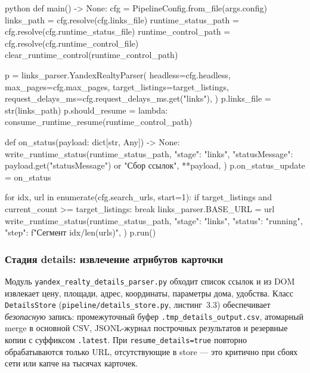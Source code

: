 \begin{singleminted}{python}
def main() -> None:
    cfg = PipelineConfig.from_file(args.config)
    links_path = cfg.resolve(cfg.links_file)
    runtime_status_path = cfg.resolve(cfg.runtime_status_file)
    runtime_control_path = cfg.resolve(cfg.runtime_control_file)
    clear_runtime_control(runtime_control_path)

    p = links_parser.YandexRealtyParser(
        headless=cfg.headless,
        max_pages=cfg.max_pages,
        target_listings=target_listings,
        request_delays_ms=cfg.request_delays_ms.get("links"),
    )
    p.links_file = str(links_path)
    p.should_resume = lambda: consume_runtime_resume(runtime_control_path)

    def on_status(payload: dict[str, Any]) -> None:
        write_runtime_status(runtime_status_path, {
            "stage": "links",
            "statusMessage": payload.get("statusMessage") or "Сбор ссылок",
            **payload,
        })
    p.on_status_update = on_status

    for idx, url in enumerate(cfg.search_urls, start=1):
        if target_listings and current_count >= target_listings:
            break
        links_parser.BASE_URL = url
        write_runtime_status(runtime_status_path, {
            "stage": "links", "status": "running",
            "step": f"Сегмент {idx}/{len(urls)}",
        })
        p.run()
\end{singleminted}
\label{lst:run-links}

\subsubsection{Стадия details: извлечение атрибутов карточки}

Модуль \texttt{yandex\_realty\_details\_parser.py} обходит список ссылок и из DOM извлекает цену, площади, адрес, координаты, параметры дома, удобства. Класс \texttt{DetailsStore} (\texttt{pipeline/details\_store.py}, листинг~3.3) обеспечивает \emph{безопасную} запись: промежуточный буфер \texttt{.tmp\_details\_output.csv}, атомарный merge в основной CSV, JSONL-журнал построчных результатов и резервные копии с суффиксом \texttt{.latest}. При \texttt{resume\_details=true} повторно обрабатываются только URL, отсутствующие в store --- это критично при сбоях сети или капче на тысячах карточек.

